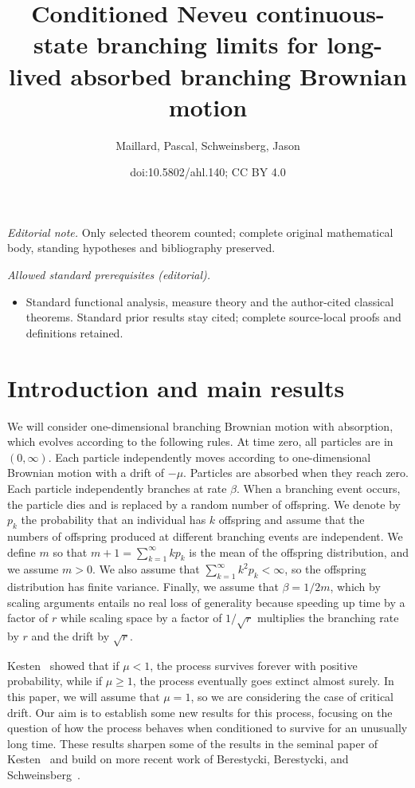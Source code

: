 \documentclass[10pt]{amsart}
\title{Conditioned Neveu continuous-state branching limits for long-lived absorbed branching Brownian motion}
\author{Maillard, Pascal, Schweinsberg, Jason}
\date{doi:10.5802/ahl.140; CC BY 4.0}
\theoremstyle{definition}\newtheorem{defi}[theo]{Definition}\newtheorem{rema}[theo]{Remark}\newtheorem{exam}[theo]{Example}\newtheorem{exem}[theo]{Example}\newtheorem{nota}[theo]{Notation}
\newcommand{\1} {\mathds{1}}
\begin{document}
\maketitle
\noindent\textit{Editorial note.} Only selected theorem counted; complete original mathematical body, standing hypotheses and bibliography preserved.\par\medskip
\noindent\textit{Allowed standard prerequisites (editorial).}\begin{itemize}
\item Standard functional analysis, measure theory and the author-cited classical theorems. Standard prior results stay cited; complete source-local proofs and definitions retained.
\end{itemize}\medskip

\section{Introduction and main results}

We will consider one-dimensional branching Brownian motion with absorption, which evolves according to the following rules. At time zero, all particles are in $(0, \infty)$. Each particle independently moves according to one-dimensional Brownian motion with a drift of $-\mu$. Particles are absorbed when they reach zero. Each particle independently branches at rate $\beta$. When a branching event occurs, the particle dies and is replaced by a random number of offspring. We denote by $p_k$ the probability that an individual has $k$ offspring and assume that the numbers of offspring produced at different branching events are independent. We define $m$ so that $m + 1 = \sum_{k=1}^{\infty} kp_k$ is the mean of the offspring distribution, and we assume $m > 0$. We also assume that $\sum_{k=1}^{\infty} k^2 p_k < \infty$, so the offspring distribution has finite variance. Finally, we assume that $\beta = 1/2m$, which by scaling arguments entails no real loss of generality because speeding up time by a factor of $r$ while scaling space by a factor of $1/\sqrt{r}$ multiplies the branching rate by $r$ and the drift by $\sqrt{r}$.

Kesten~\cite{kesten} showed that if $\mu < 1$, the process survives forever with positive probability, while if $\mu \geq 1$, the process eventually goes extinct almost surely. In this paper, we will assume that $\mu = 1$, so we are considering the case of critical drift. Our aim is to establish some new results for this process, focusing on the question of how the process behaves when conditioned to survive for an unusually long time. These results sharpen some of the results in the seminal paper of Kesten~\cite{kesten} and build on more recent work of Berestycki, Berestycki, and Schweinsberg~\cite{bbs, bbs3}.
\end{document}

